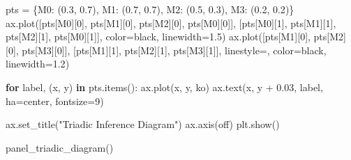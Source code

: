\documentclass[
  11pt,
]{article}
\newenvironment{Shaded}{\begin{snugshade}}{\end{snugshade}}
\newcommand{\ControlFlowTok}[1]{\textcolor[rgb]{0.00,0.23,0.31}{\textbf{#1}}}
\newcommand{\DecValTok}[1]{\textcolor[rgb]{0.68,0.00,0.00}{#1}}
\newcommand{\FloatTok}[1]{\textcolor[rgb]{0.68,0.00,0.00}{#1}}
\newcommand{\KeywordTok}[1]{\textcolor[rgb]{0.00,0.23,0.31}{\textbf{#1}}}
\newcommand{\NormalTok}[1]{\textcolor[rgb]{0.00,0.23,0.31}{#1}}
\newcommand{\OperatorTok}[1]{\textcolor[rgb]{0.37,0.37,0.37}{#1}}
\newcommand{\StringTok}[1]{\textcolor[rgb]{0.13,0.47,0.30}{#1}}
\begin{document}
\begin{Shaded}
\begin{Highlighting}[]
\NormalTok{    pts }\OperatorTok{=}\NormalTok{ \{}\StringTok{\textquotesingle{}M0\textquotesingle{}}\NormalTok{: (}\FloatTok{0.3}\NormalTok{, }\FloatTok{0.7}\NormalTok{), }\StringTok{\textquotesingle{}M1\textquotesingle{}}\NormalTok{: (}\FloatTok{0.7}\NormalTok{, }\FloatTok{0.7}\NormalTok{), }\StringTok{\textquotesingle{}M2\textquotesingle{}}\NormalTok{: (}\FloatTok{0.5}\NormalTok{, }\FloatTok{0.3}\NormalTok{), }\StringTok{\textquotesingle{}M3\textquotesingle{}}\NormalTok{: (}\FloatTok{0.2}\NormalTok{, }\FloatTok{0.2}\NormalTok{)\}}
\NormalTok{    ax.plot([pts[}\StringTok{\textquotesingle{}M0\textquotesingle{}}\NormalTok{][}\DecValTok{0}\NormalTok{], pts[}\StringTok{\textquotesingle{}M1\textquotesingle{}}\NormalTok{][}\DecValTok{0}\NormalTok{], pts[}\StringTok{\textquotesingle{}M2\textquotesingle{}}\NormalTok{][}\DecValTok{0}\NormalTok{], pts[}\StringTok{\textquotesingle{}M0\textquotesingle{}}\NormalTok{][}\DecValTok{0}\NormalTok{]],}
\NormalTok{            [pts[}\StringTok{\textquotesingle{}M0\textquotesingle{}}\NormalTok{][}\DecValTok{1}\NormalTok{], pts[}\StringTok{\textquotesingle{}M1\textquotesingle{}}\NormalTok{][}\DecValTok{1}\NormalTok{], pts[}\StringTok{\textquotesingle{}M2\textquotesingle{}}\NormalTok{][}\DecValTok{1}\NormalTok{], pts[}\StringTok{\textquotesingle{}M0\textquotesingle{}}\NormalTok{][}\DecValTok{1}\NormalTok{]],}
\NormalTok{            color}\OperatorTok{=}\StringTok{\textquotesingle{}black\textquotesingle{}}\NormalTok{, linewidth}\OperatorTok{=}\FloatTok{1.5}\NormalTok{)}
\NormalTok{    ax.plot([pts[}\StringTok{\textquotesingle{}M1\textquotesingle{}}\NormalTok{][}\DecValTok{0}\NormalTok{], pts[}\StringTok{\textquotesingle{}M2\textquotesingle{}}\NormalTok{][}\DecValTok{0}\NormalTok{], pts[}\StringTok{\textquotesingle{}M3\textquotesingle{}}\NormalTok{][}\DecValTok{0}\NormalTok{]],}
\NormalTok{            [pts[}\StringTok{\textquotesingle{}M1\textquotesingle{}}\NormalTok{][}\DecValTok{1}\NormalTok{], pts[}\StringTok{\textquotesingle{}M2\textquotesingle{}}\NormalTok{][}\DecValTok{1}\NormalTok{], pts[}\StringTok{\textquotesingle{}M3\textquotesingle{}}\NormalTok{][}\DecValTok{1}\NormalTok{]],}
\NormalTok{            linestyle}\OperatorTok{=}\StringTok{\textquotesingle{}{-}{-}\textquotesingle{}}\NormalTok{, color}\OperatorTok{=}\StringTok{\textquotesingle{}black\textquotesingle{}}\NormalTok{, linewidth}\OperatorTok{=}\FloatTok{1.2}\NormalTok{)}
    
    \ControlFlowTok{for}\NormalTok{ label, (x, y) }\KeywordTok{in}\NormalTok{ pts.items():}
\NormalTok{        ax.plot(x, y, }\StringTok{\textquotesingle{}ko\textquotesingle{}}\NormalTok{)}
\NormalTok{        ax.text(x, y }\OperatorTok{+} \FloatTok{0.03}\NormalTok{, label, ha}\OperatorTok{=}\StringTok{\textquotesingle{}center\textquotesingle{}}\NormalTok{, fontsize}\OperatorTok{=}\DecValTok{9}\NormalTok{)}
        
\NormalTok{    ax.set\_title(}\StringTok{"Triadic Inference Diagram"}\NormalTok{)}
\NormalTok{    ax.axis(}\StringTok{\textquotesingle{}off\textquotesingle{}}\NormalTok{)}
\NormalTok{    plt.show()}

\NormalTok{panel\_triadic\_diagram()}
\end{Highlighting}
\end{Shaded}
\end{document}
